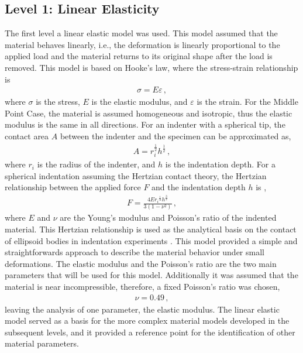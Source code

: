 \subsection{Level 1: Linear Elasticity}
The first level a linear elastic model was used. This model assumed that the material behaves linearly, 
i.e., the deformation is linearly proportional to the applied load and the material returns to its original 
shape after the load is removed. This model is based on Hooke's law, where the stress-strain relationship is 
\begin{align}
    \sigma = E\varepsilon \, ,
\end{align}
where $\sigma$ is the stress, $E$ is the elastic modulus, and $\varepsilon$ is the strain. 
For the Middle Point Case, the material is assumed homogeneous and isotropic, thus the elastic modulus is the 
same in all directions. 
For an indenter with a spherical tip, the contact area $A$ between the indenter and the specimen can be approximated as, 
\begin{align}
    A = r_i^{\frac{1}{2}} h^{\frac{1}{2}} \, ,
\end{align}
where $r_i$ is the radius of the indenter, and $h$ is the indentation depth.
For a spherical indentation assuming the Hertzian contact theory, the Hertzian relationship 
between the applied force $F$ and the indentation depth $h$ is \cite{Lin2009}, 
\begin{align}
    F = \frac{4E{r_i}^{\frac{1}{2}} {h}^{\frac{3}{2}}}{3(1-\nu^2)} \, ,
    \label{eq:forcelinear}
\end{align}
where $E$ and $\nu$ are the Young's modulus and Poisson's ratio of the indented material.
This Hertzian relationship is used as the analytical basis on the contact of ellipsoid bodies in 
indentation experiments \cite{Lin2009}.
This model provided a simple and straightforwards approach to describe the material behavior under 
small deformations. The elastic modulus and the Poisson's ratio are the two main parameters 
that will be used for this model. Additionally it was assumed that the material is near incompressible,
therefore, a fixed Poisson's ratio was chosen, 
\begin{align}
    \nu = 0.49 \, ,
\end{align}
leaving the analysis of one parameter, the elastic modulus. The linear elastic model served as a basis for the more 
complex material models developed in the subsequent levels, and it provided a reference point for 
the identification of other material parameters.



